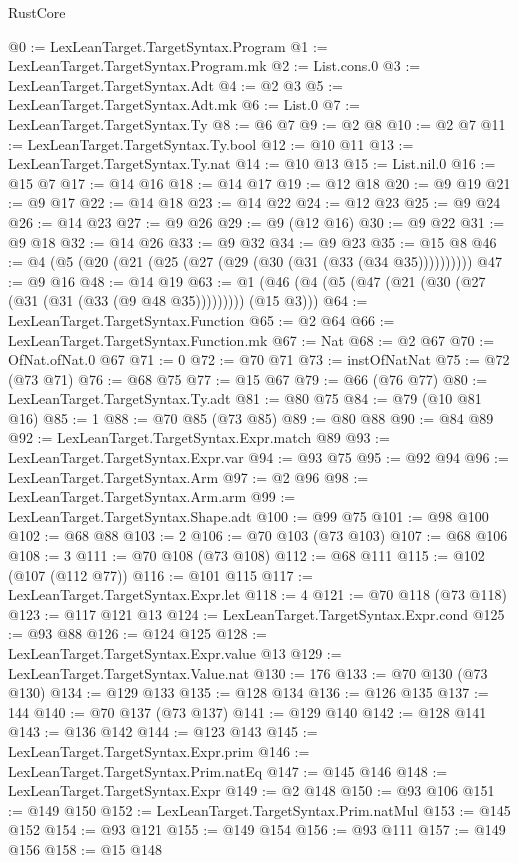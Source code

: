 \begin{lexlean}{RustCore}
\begin{coremodule}
@0 := LexLeanTarget.TargetSyntax.Program
@1 := LexLeanTarget.TargetSyntax.Program.mk
@2 := List.cons.{0}
@3 := LexLeanTarget.TargetSyntax.Adt
@4 := @2 @3
@5 := LexLeanTarget.TargetSyntax.Adt.mk
@6 := List.{0}
@7 := LexLeanTarget.TargetSyntax.Ty
@8 := @6 @7
@9 := @2 @8
@10 := @2 @7
@11 := LexLeanTarget.TargetSyntax.Ty.bool
@12 := @10 @11
@13 := LexLeanTarget.TargetSyntax.Ty.nat
@14 := @10 @13
@15 := List.nil.{0}
@16 := @15 @7
@17 := @14 @16
@18 := @14 @17
@19 := @12 @18
@20 := @9 @19
@21 := @9 @17
@22 := @14 @18
@23 := @14 @22
@24 := @12 @23
@25 := @9 @24
@26 := @14 @23
@27 := @9 @26
@29 := @9 (@12 @16)
@30 := @9 @22
@31 := @9 @18
@32 := @14 @26
@33 := @9 @32
@34 := @9 @23
@35 := @15 @8
@46 := @4 (@5 (@20 (@21 (@25 (@27 (@29 (@30 (@31 (@33 (@34 @35))))))))))
@47 := @9 @16
@48 := @14 @19
@63 := @1 (@46 (@4 (@5 (@47 (@21 (@30 (@27 (@31 (@31 (@33 (@9 @48 @35))))))))) (@15 @3)))
@64 := LexLeanTarget.TargetSyntax.Function
@65 := @2 @64
@66 := LexLeanTarget.TargetSyntax.Function.mk
@67 := Nat
@68 := @2 @67
@70 := OfNat.ofNat.{0} @67
@71 := 0
@72 := @70 @71
@73 := instOfNatNat
@75 := @72 (@73 @71)
@76 := @68 @75
@77 := @15 @67
@79 := @66 (@76 @77)
@80 := LexLeanTarget.TargetSyntax.Ty.adt
@81 := @80 @75
@84 := @79 (@10 @81 @16)
@85 := 1
@88 := @70 @85 (@73 @85)
@89 := @80 @88
@90 := @84 @89
@92 := LexLeanTarget.TargetSyntax.Expr.match @89
@93 := LexLeanTarget.TargetSyntax.Expr.var
@94 := @93 @75
@95 := @92 @94
@96 := LexLeanTarget.TargetSyntax.Arm
@97 := @2 @96
@98 := LexLeanTarget.TargetSyntax.Arm.arm
@99 := LexLeanTarget.TargetSyntax.Shape.adt
@100 := @99 @75
@101 := @98 @100
@102 := @68 @88
@103 := 2
@106 := @70 @103 (@73 @103)
@107 := @68 @106
@108 := 3
@111 := @70 @108 (@73 @108)
@112 := @68 @111
@115 := @102 (@107 (@112 @77))
@116 := @101 @115
@117 := LexLeanTarget.TargetSyntax.Expr.let
@118 := 4
@121 := @70 @118 (@73 @118)
@123 := @117 @121 @13
@124 := LexLeanTarget.TargetSyntax.Expr.cond
@125 := @93 @88
@126 := @124 @125
@128 := LexLeanTarget.TargetSyntax.Expr.value @13
@129 := LexLeanTarget.TargetSyntax.Value.nat
@130 := 176
@133 := @70 @130 (@73 @130)
@134 := @129 @133
@135 := @128 @134
@136 := @126 @135
@137 := 144
@140 := @70 @137 (@73 @137)
@141 := @129 @140
@142 := @128 @141
@143 := @136 @142
@144 := @123 @143
@145 := LexLeanTarget.TargetSyntax.Expr.prim
@146 := LexLeanTarget.TargetSyntax.Prim.natEq
@147 := @145 @146
@148 := LexLeanTarget.TargetSyntax.Expr
@149 := @2 @148
@150 := @93 @106
@151 := @149 @150
@152 := LexLeanTarget.TargetSyntax.Prim.natMul
@153 := @145 @152
@154 := @93 @121
@155 := @149 @154
@156 := @93 @111
@157 := @149 @156
@158 := @15 @148

\end{coremodule}
\end{lexlean}
